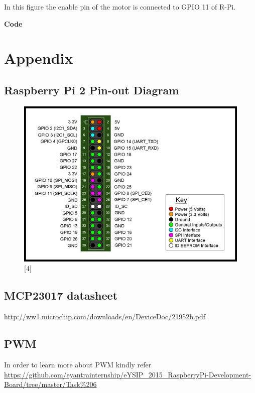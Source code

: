 \documentclass[11pt,a4paper]{article}
\begin{document}
	In this figure the enable pin of the motor is connected to GPIO 11 of R-Pi.
	
	\vspace{0.3cm}
	\textbf{Code}
	\vspace{0.3cm}
	
	
	
	\newpage
	\section{Appendix}
	
	\subsection{Raspberry Pi 2 Pin-out Diagram}
	\begin{figure}[h!]
		\includegraphics[scale=0.6]{RaspberryPi2_pinout.jpg}
		\centering
		\caption{[4]}
	\end{figure}
	
	\subsection{MCP23017 datasheet}
	
	\url{http://ww1.microchip.com/downloads/en/DeviceDoc/21952b.pdf}
	
	\subsection{PWM}
	In order to learn more about PWM kindly refer \url{https://github.com/eyantrainternship/eYSIP_2015_RaspberryPi-Development-Board/tree/master/Task%206}
		
\end{document}
